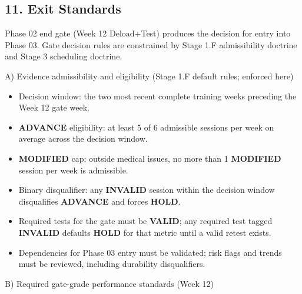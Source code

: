 \documentclass[10pt]{article}
\begin{document}
\subsection*{11. Exit Standards}

Phase 02 end gate (Week 12 Deload+Test) produces the decision for entry into Phase 03. Gate decision rules are constrained by Stage 1.F admissibility doctrine and Stage 3 scheduling doctrine.

A) Evidence admissibility and eligibility (Stage 1.F default rules; enforced here)

\begin{itemize}
\item Decision window: the two most recent complete training weeks preceding the Week 12 gate week.
\item \textbf{ADVANCE} eligibility: at least 5 of 6 admissible sessions per week on average across the decision window.
\item \textbf{MODIFIED} cap: outside medical issues, no more than 1 \textbf{MODIFIED} session per week is admissible.
\item Binary disqualifier: any \textbf{INVALID} session within the decision window disqualifies \textbf{ADVANCE} and forces \textbf{HOLD}.
\item Required tests for the gate must be \textbf{VALID}; any required test tagged \textbf{INVALID} defaults \textbf{HOLD} for that metric until a valid retest exists.
\item Dependencies for Phase 03 entry must be validated; risk flags and trends must be reviewed, including durability disqualifiers.
\end{itemize}

B) Required gate-grade performance standards (Week 12)
\end{document}
